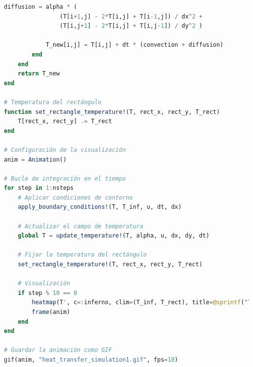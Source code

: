 \begin{lstlisting}[language=Julia]
            diffusion = alpha * (
                (T[i+1,j] - 2*T[i,j] + T[i-1,j]) / dx^2 +
                (T[i,j+1] - 2*T[i,j] + T[i,j-1]) / dy^2 )
            
            T_new[i,j] = T[i,j] + dt * (convection + diffusion)
        end
    end
    return T_new
end

# Temperatura del rectángulo
function set_rectangle_temperature!(T, rect_x, rect_y, T_rect)
    T[rect_x, rect_y] .= T_rect
end

# Configuración de la visualización
anim = Animation()

# Bucle de integración en el tiempo
for step in 1:nsteps
    # Aplicar condiciones de contorno
    apply_boundary_conditions!(T, T_inf, u, dt, dx)

    # Actualizar el campo de temperatura
    global T = update_temperature!(T, alpha, u, dx, dy, dt)

    # Fijar la temperatura del rectángulo
    set_rectangle_temperature!(T, rect_x, rect_y, T_rect)

    # Visualización
    if step % 10 == 0
        heatmap(T', c=:inferno, clim=(T_inf, T_rect), title=@sprintf("Time: %.3f s", step*dt))
        frame(anim)
    end
end

# Guardar la animación como GIF
gif(anim, "heat_transfer_simulation1.gif", fps=10)

\end{lstlisting}
